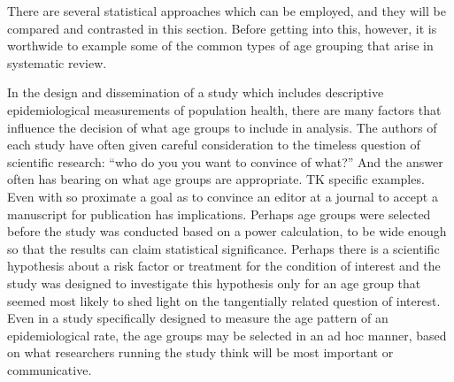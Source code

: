 There are several statistical approaches which can be employed, and
they will be compared and contrasted in this section.  Before getting
into this, however, it is worthwide to example some of the common
types of age grouping that arise in systematic review.

In the design and dissemination of a study which includes descriptive
epidemiological measurements of population health, there are many
factors that influence the decision of what age groups to include in
analysis.  The authors of each study have often given careful
consideration to the timeless question of scientific research: ``who
do you you want to convince of what?''  And the answer often has
bearing on what age groups are appropriate. TK specific examples.
Even with so proximate a goal as to convince an editor at a journal to
accept a manuscript for publication has implications.  Perhaps age
groups were selected before the study was conducted based on a power
calculation, to be wide enough so that the results can claim
statistical significance.  Perhaps there is a scientific hypothesis
about a risk factor or treatment for the condition of interest and the
study was designed to investigate this hypothesis only for an age
group that seemed most likely to shed light on the tangentially
related question of interest.  Even in a study specifically designed
to measure the age pattern of an epidemiological rate, the age groups
may be selected in an ad hoc manner, based on what researchers running
the study think will be most important or communicative.

